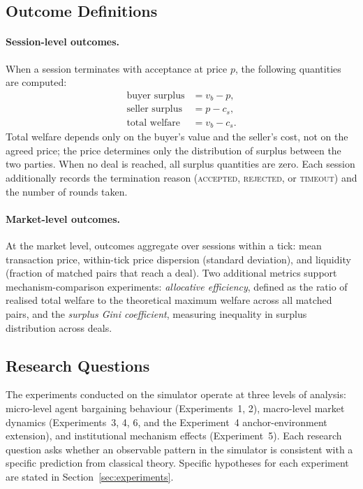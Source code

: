\subsection{Outcome Definitions}
\label{sec:outcomes}

\paragraph{Session-level outcomes.}
When a session terminates with acceptance at price $p$, the following quantities are computed:
\begin{align}
    \text{buyer surplus} &= v_b - p, \\
    \text{seller surplus} &= p - c_s, \\
    \text{total welfare} &= v_b - c_s.
\end{align}
Total welfare depends only on the buyer's value and the seller's cost, not on the agreed price; the price determines only the distribution of surplus between the two parties.  When no deal is reached, all surplus quantities are zero.  Each session additionally records the termination reason (\textsc{accepted}, \textsc{rejected}, or \textsc{timeout}) and the number of rounds taken.

\paragraph{Market-level outcomes.}
At the market level, outcomes aggregate over sessions within a tick: mean transaction price, within-tick price dispersion (standard deviation), and liquidity (fraction of matched pairs that reach a deal).  Two additional metrics support mechanism-comparison experiments: \emph{allocative efficiency}, defined as the ratio of realised total welfare to the theoretical maximum welfare across all matched pairs, and the \emph{surplus Gini coefficient}, measuring inequality in surplus distribution across deals.

\subsection{Research Questions}
\label{sec:rqs}

The experiments conducted on the simulator operate at three levels of analysis: micro-level agent bargaining behaviour (Experiments~1, 2), macro-level market dynamics (Experiments~3, 4, 6, and the Experiment~4 anchor-environment extension), and institutional mechanism effects (Experiment~5).  Each research question asks whether an observable pattern in the simulator is consistent with a specific prediction from classical theory.  Specific hypotheses for each experiment are stated in Section~\ref{sec:experiments}.

